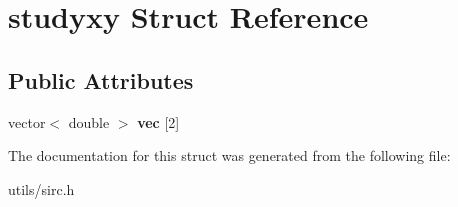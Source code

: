 \hypertarget{structstudyxy}{}\section{studyxy Struct Reference}
\label{structstudyxy}
\subsection*{Public Attributes}
\begin{DoxyCompactItemize}
\item 
\mbox{\label{structstudyxy_ab3b69345135f92cbdd3e222e5ef1c981}} 
vector$<$ double $>$ {\bfseries vec} \mbox{[}2\mbox{]}
\end{DoxyCompactItemize}


The documentation for this struct was generated from the following file\+:\begin{DoxyCompactItemize}
\item 
utils/sirc.\+h\end{DoxyCompactItemize}
